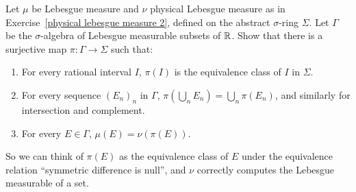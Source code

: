 \begin{exercise}\label{physical lebesgue measure 3}
Let $\mu$ be Lebesgue measure and $\nu$ physical Lebesgue measure as in Exercise~\ref{physical lebesgue measure 2}, defined on the abstract $\sigma$-ring $\Sigma$.
Let $\Gamma$ be the $\sigma$-algebra of Lebesgue measurable subsets of $\mathbb{R}$. Show that there is a surjective map $\pi: \Gamma \to \Sigma$ such that:
\begin{enumerate}
\item For every rational interval $I$, $\pi(I)$ is the equivalence class of $I$ in $\Sigma$.
\item For every sequence ${(E_{n})}_{n}$ in $\Gamma$, $\pi(\bigcup_{n} E_{n}) = \bigcup_{n} \pi(E_{n})$, and similarly for intersection and complement.
\item For every $E \in \Gamma$, $\mu(E) = \nu(\pi(E))$.
\end{enumerate}
So we can think of $\pi(E)$ as the equivalence class of $E$ under the equivalence relation ``symmetric difference is null'', and $\nu$ correctly computes the Lebesgue measurable of a set.
\end{exercise}
